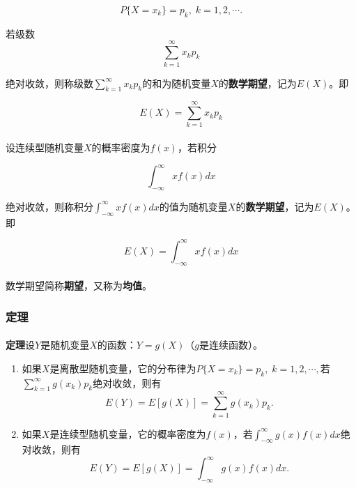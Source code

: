\begin{equation*}
  P\{X=x_k\} = p_k, \; k = 1,2,\cdots.
\end{equation*}

若级数
\begin{equation*}
  \sum_{k=1}^\infty x_k p_k
\end{equation*}

绝对收敛，则称级数$\displaystyle \sum_{k=1}^\infty x_k p_k$的和为随机变量$X$的\textbf{数学期望}，记为$E(X)$。即

\begin{equation}
  \label{离散型随机变量的数学期望}
  E(X) = \sum_{k=1}^\infty x_k p_k
\end{equation}

\paragraph{}
设连续型随机变量$X$的概率密度为$f(x)$，若积分

\begin{equation*}
  \int_{-\infty}^\infty xf(x)dx
\end{equation*}

绝对收敛，则称积分$\displaystyle \int_{-\infty}^\infty xf(x)dx$的值为随机变量$X$的\textbf{数学期望}，记为$E(X)$。即

\begin{equation}
  \label{随机型随机变量的数学期望}
  E(X)=\int_{-\infty}^\infty xf(x)dx
\end{equation}

\paragraph{}
数学期望简称\textbf{期望}，又称为\textbf{均值}。

\subsubsection{定理}
\paragraph{}
\textbf{定理\;}设$Y$是随机变量$X$的函数：$Y=g(X)$（$g$是连续函数）。
\begin{enumerate}
  \item 如果$X$是离散型随机变量，它的分布律为$P\{X=x_k\}=p_k, \; k = 1,2,\cdots,$若$\displaystyle \sum_{k=1}^\infty g(x_k)p_k$绝对收敛，则有
  \begin{equation}
    E(Y)=E[g(X)]=\sum_{k=1}^\infty g(x_k)p_k.
  \end{equation}
  \item 如果$X$是连续型随机变量，它的概率密度为$f(x)$，若$\displaystyle \int_{-\infty}^\infty g(x)f(x)dx$绝对收敛，则有
  \begin{equation}
    E(Y) = E[g(X)] = \int_{-\infty}^\infty g(x)f(x)dx.
  \end{equation}
\end{enumerate}

